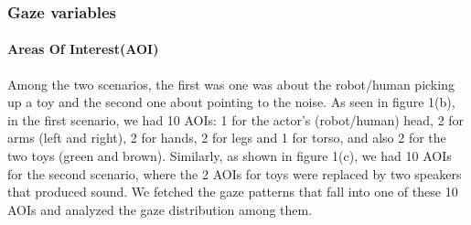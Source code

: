 \documentclass[a4,twocolumn,10pt]{article}
\begin{document}
\subsubsection{Gaze variables}

\paragraph{Areas Of Interest(AOI)}

Among the two scenarios, the first was one was about the robot/human picking up
a toy and the second one about pointing to the noise. As seen in figure 1(b), in
the first scenario, we had 10 AOIs: 1 for the actor's (robot/human) head, 2 for
arms (left and right), 2 for hands, 2 for legs and 1 for torso, and also 2 for
the two toys (green and brown). Similarly, as shown in figure 1(c), we had 10
AOIs for the second scenario, where the 2 AOIs for toys were replaced by two
speakers that produced sound. We fetched the gaze patterns that fall into one of
these 10 AOIs and analyzed the gaze distribution among them.
\end{document}
